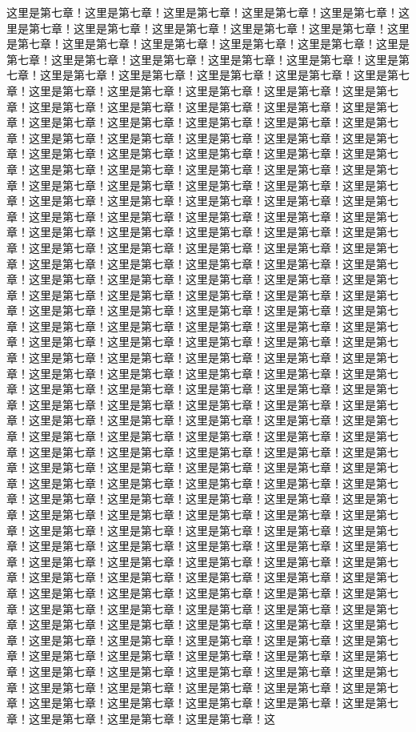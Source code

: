
\label{sec7}
这里是第七章！这里是第七章！这里是第七章！这里是第七章！这里是第七章！这里是第七章！这里是第七章！这里是第七章！这里是第七章！这里是第七章！这里是第七章！这里是第七章！这里是第七章！这里是第七章！这里是第七章！这里是第七章！这里是第七章！这里是第七章！这里是第七章！这里是第七章！这里是第七章！这里是第七章！这里是第七章！这里是第七章！这里是第七章！这里是第七章！这里是第七章！这里是第七章！这里是第七章！这里是第七章！这里是第七章！这里是第七章！这里是第七章！这里是第七章！这里是第七章！这里是第七章！这里是第七章！这里是第七章！这里是第七章！这里是第七章！这里是第七章！这里是第七章！这里是第七章！这里是第七章！这里是第七章！这里是第七章！这里是第七章！这里是第七章！这里是第七章！这里是第七章！这里是第七章！这里是第七章！这里是第七章！这里是第七章！这里是第七章！这里是第七章！这里是第七章！这里是第七章！这里是第七章！这里是第七章！这里是第七章！这里是第七章！这里是第七章！这里是第七章！这里是第七章！这里是第七章！这里是第七章！这里是第七章！这里是第七章！这里是第七章！这里是第七章！这里是第七章！这里是第七章！这里是第七章！这里是第七章！这里是第七章！这里是第七章！这里是第七章！这里是第七章！这里是第七章！这里是第七章！这里是第七章！这里是第七章！这里是第七章！这里是第七章！这里是第七章！这里是第七章！这里是第七章！这里是第七章！这里是第七章！这里是第七章！这里是第七章！这里是第七章！这里是第七章！这里是第七章！这里是第七章！这里是第七章！这里是第七章！这里是第七章！这里是第七章！这里是第七章！这里是第七章！这里是第七章！这里是第七章！这里是第七章！这里是第七章！这里是第七章！这里是第七章！这里是第七章！这里是第七章！这里是第七章！这里是第七章！这里是第七章！这里是第七章！这里是第七章！这里是第七章！这里是第七章！这里是第七章！这里是第七章！这里是第七章！这里是第七章！这里是第七章！这里是第七章！这里是第七章！这里是第七章！这里是第七章！这里是第七章！这里是第七章！这里是第七章！这里是第七章！这里是第七章！这里是第七章！这里是第七章！这里是第七章！这里是第七章！这里是第七章！这里是第七章！这里是第七章！这里是第七章！这里是第七章！这里是第七章！这里是第七章！这里是第七章！这里是第七章！这里是第七章！这里是第七章！这里是第七章！这里是第七章！这里是第七章！这里是第七章！这里是第七章！这里是第七章！这里是第七章！这里是第七章！这里是第七章！这里是第七章！这里是第七章！这里是第七章！这里是第七章！这里是第七章！这里是第七章！这里是第七章！这里是第七章！这里是第七章！这里是第七章！这里是第七章！这里是第七章！这里是第七章！这里是第七章！这里是第七章！这里是第七章！这里是第七章！这里是第七章！这里是第七章！这里是第七章！这里是第七章！这里是第七章！这里是第七章！这里是第七章！这里是第七章！这里是第七章！这里是第七章！这里是第七章！这里是第七章！这里是第七章！这里是第七章！这里是第七章！这里是第七章！这里是第七章！这里是第七章！这里是第七章！这里是第七章！这里是第七章！这里是第七章！这里是第七章！这里是第七章！这里是第七章！这里是第七章！这里是第七章！这里是第七章！这里是第七章！这里是第七章！这里是第七章！这里是第七章！这里是第七章！这里是第七章！这里是第七章！这里是第七章！这里是第七章！这里是第七章！这里是第七章！这里是第七章！这里是第七章！这里是第七章！这里是第七章！这里是第七章！这里是第七章！这里是第七章！这里是第七章！这里是第七章！这里是第七章！这里是第七章！这里是第七章！这里是第七章！这里是第七章！这里是第七章！这里是第七章！这里是第七章！这里是第七章！这